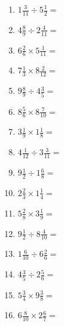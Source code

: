 \documentclass[12pt]{article}
\begin{document}
\begin{enumerate}
\item \large $ 1 \frac{3}{11} \div 5 \frac{1}{2} = $ \vspace{1.6cm}
\item \large $ 4 \frac{8}{9} \div 2 \frac{4}{11} = $ \vspace{1.6cm}
\item \large $ 6 \frac{2}{6} \times 5 \frac{1}{11} = $ \vspace{1.6cm}
\item \large $ 7 \frac{1}{3} \times 8 \frac{2}{12} = $ \vspace{1.6cm}
\item \large $ 9 \frac{8}{9} \div 4 \frac{3}{5} = $ \vspace{1.6cm}
\item \large $ 8 \frac{5}{6} \times 8 \frac{7}{10} = $ \vspace{1.6cm}
\newpage
\item \large $ 3 \frac{1}{9} \times 1 \frac{1}{8} = $ \vspace{1.6cm}
\item \large $ 4 \frac{1}{12} \div 3 \frac{3}{11} = $ \vspace{1.6cm}
\item \large $ 9 \frac{1}{2} \div 1 \frac{6}{8} = $ \vspace{1.6cm}
\item \large $ 2 \frac{2}{3} \times 1 \frac{1}{4} = $ \vspace{1.6cm}
\item \large $ 5 \frac{2}{8} \times 3 \frac{1}{9} = $ \vspace{1.6cm}
\item \large $ 9 \frac{1}{2} \div 8 \frac{4}{10} = $ \vspace{1.6cm}
\item \large $ 1 \frac{6}{10} \div 6 \frac{2}{6} = $ \vspace{1.6cm}
\item \large $ 4 \frac{3}{5} \div 2 \frac{5}{6} = $ \vspace{1.6cm}
\item \large $ 5 \frac{3}{4} \times 9 \frac{3}{8} = $ \vspace{1.6cm}
\item \large $ 6 \frac{8}{10} \times 2 \frac{6}{7} = $ \vspace{1.6cm}
\end{enumerate}
\newpage
\end{document}
